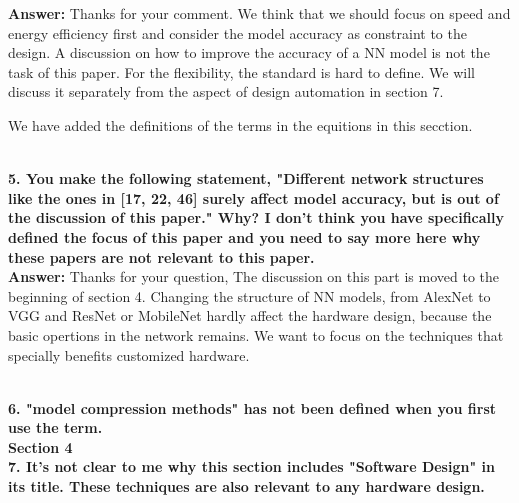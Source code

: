 \documentclass[12pt]{paper}
\newcommand{\rev}[1]{{{\color[rgb]{0,0,1}{#1}}}}
\newcommand{\answer}[1]{\noindent\textbf{Answer:} #1\\}
\newcommand{\comment}[1]{\noindent\textbf{#1}\\}
\begin{document}
\answer{Thanks for your comment. We think that we should focus on speed and energy efficiency first and consider the model accuracy as constraint to the design. A discussion on how to improve the accuracy of a NN model is not the task of this paper. For the flexibility, the standard is hard to define. We will discuss it separately from the aspect of design automation in section 7.

We have added the definitions of the terms in the equitions in this secction. 

\rev{Peak performance, measured in operations (multiplication or addition) per second, is achieved when all the computation units work every clock cycle. Utilization denotes the average ratio of working cycles of the computation units. The workload measures the number of operations in the target neural network.}}

\comment{5. You make the following statement, "Different network structures like the ones in [17, 22, 46] surely affect model accuracy, but is out of the discussion of this paper." Why? I don't think you have specifically defined the focus of this paper and you need to say more here why these papers are not relevant to this paper.}

\answer{Thanks for your question, The discussion on this part is moved to the beginning of section 4. Changing the structure of NN models, from AlexNet to VGG and ResNet or MobileNet hardly affect the hardware design, because the basic opertions in the network remains. We want to focus on the techniques that specially benefits customized hardware.

\rev{A larger NN model usually results in a higher model accuracy. This means it is possible to tradeoff between the model accuracy and the hardware speed or energy cost. Neural network researchers are designing more effcient network models from AlexNet [22] to ResNet [16], SqueezeNet [19] and MobileNet [18]. The main differences between these networks are the size of and the connections between each layer. The basic operations are the same and hardly affect the hardware design. For this reason, we will not focus on these techniques in this paper.}}

\comment{6. "model compression methods" has not been defined when you first use the term.}

{\noindent\textbf{Section 4}}\\

\comment{7. It's not clear to me why this section includes "Software Design" in its title. These techniques are also relevant to any hardware design.}
\end{document}
